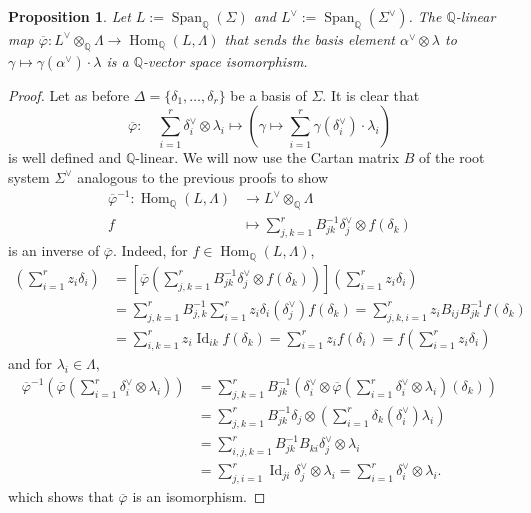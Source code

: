 \documentclass[12pt]{amsart}
\newcommand{\Q}{\mathbb{Q} }
\numberwithin{equation}{section}
\newtheorem{proposition}[theorem]{Proposition}
\theoremstyle{remark} %
\begin{document}
\begin{proposition}\label{prop:apt2}
	Let $L:= \operatorname{Span}_{\Q}(\Sigma)$ and $L^\vee := \operatorname{Span}_{\Q}(\Sigma^\vee)$. The $\Q$-linear map $\overline{\varphi} \colon L^\vee \otimes_\Q \Lambda \to \operatorname{Hom}_{\Q}(L,\Lambda)$ that sends the basis element $ \alpha^\vee \otimes \lambda $ to $\gamma \mapsto \gamma(\alpha^\vee) \cdot \lambda$ is a $\Q$-vector space isomorphism.
\end{proposition}
\begin{proof}
	 Let as before $\Delta= \{\delta_1, \ldots, \delta_r\}$ be a basis of $\Sigma$. It is clear that 
	 $$
	 \overline{\varphi} \colon \quad  \sum_{i=1}^r \delta_i^\vee \otimes \lambda_i \mapsto \left( \gamma \mapsto \sum_{i=1}^r \gamma(\delta_i^\vee) \cdot \lambda_i \right)
	 $$
	 is well defined and $\Q$-linear. We will now use the Cartan matrix $B$ of the root system $\Sigma^\vee$ analogous to the previous proofs to show
	 \begin{align*}
	 	\overline{\varphi}^{-1} \colon \operatorname{Hom}_{\Q}(L,\Lambda) & \to L^\vee \otimes_\Q \Lambda \\
	 	f & \mapsto \sum_{j,k=1}^r  B_{jk}^{-1} \delta_j^\vee \otimes f(\delta_k)
	 \end{align*}
 is an inverse of $\overline{\varphi}$. Indeed, for $f\in \operatorname{Hom}_{\Q}(L,\Lambda)$,
 \begin{align*}
 	[\overline{\varphi} \circ \overline{\varphi}^{-1} (f)] \left( \sum_{i=1}^r{z_i \delta_i}\right) &= \left[\overline{\varphi} \left( \sum_{j,k=1}^r  B_{jk}^{-1} \delta_j^\vee \otimes f(\delta_k) \right)\right]\left( \sum_{i=1}^r{z_i \delta_i}\right) \\
 	&= \sum_{j,k = 1}^r  B_{j,k}^{-1} \sum_{i=1}^r z_i \delta_i(\delta_j^\vee)  f(\delta_k) = \sum_{j,k,i = 1}^r z_i  B_{ij}  B_{jk}^{-1} f(\delta_k) \\
 	&= \sum_{i,k = 1}^r z_i \operatorname{Id}_{ik} f(\delta_k) = \sum_{i=1}^r z_i f(\delta_i) = f\left(\sum_{i=1}^r z_i\delta_i\right) 
 \end{align*}
and for $\lambda_i \in \Lambda$,
\begin{align*}
	\overline{\varphi}^{-1}\left( \overline{\varphi} \left( \sum_{i=1}^r \delta_i^\vee \otimes \lambda_i \right)\right) 
	&= \sum_{j,k=1}^r  B_{jk}^{-1} \left(\delta_i^\vee \otimes \overline{\varphi}\left( \sum_{i=1}^r \delta_i^\vee \otimes \lambda_i \right)(\delta_k)\right)  \\
&= \sum_{j,k=1}^r  B_{jk}^{-1} \delta_j \otimes \left(\sum_{i=1}^r \delta_k(\delta_i^\vee) \lambda_i \right) \\ 
&= \sum_{i,j,k = 1}^r  B_{jk}^{-1} B_{ki} \delta_j^\vee \otimes \lambda_i \\
&= \sum_{j,i=1}^r \operatorname{Id}_{ji} \delta_{j}^\vee \otimes \lambda_i 
= \sum_{i=1}^r \delta_i^\vee \otimes \lambda_i.
\end{align*}
which shows that $\overline{\varphi}$ is an isomorphism.
\end{proof}
\end{document}
